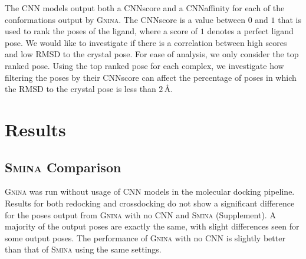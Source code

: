 \documentclass[journal=jcisd8,manuscript=article]{achemso}
\begin{document}
The CNN models output both a CNNscore and a CNNaffinity for each of the conformations output by \textsc{Gnina}. The CNNscore is a value between $0$ and $1$ that is used to rank the poses of the ligand, where a score of $1$ denotes a perfect ligand pose. We would like to investigate if there is a correlation between high scores and low RMSD to the crystal pose. For ease of analysis, we only consider the top ranked pose. Using the top ranked pose for each complex, we investigate how filtering the poses by their CNNscore can affect the percentage of poses in which the RMSD to the crystal pose is less than $2\,$\AA.

\section{Results}
\subsection{\textsc{Smina} Comparison}
\textsc{Gnina} was run without usage of CNN models in the molecular docking pipeline. Results for both redocking and crossdocking do not show a significant difference for the poses output from \textsc{Gnina} with no CNN and \textsc{Smina} (Supplement). A majority of the output poses are exactly the same, with slight differences seen for some output poses. The performance of \textsc{Gnina} with no CNN is slightly better than that of \textsc{Smina} using the same settings.
\end{document}
